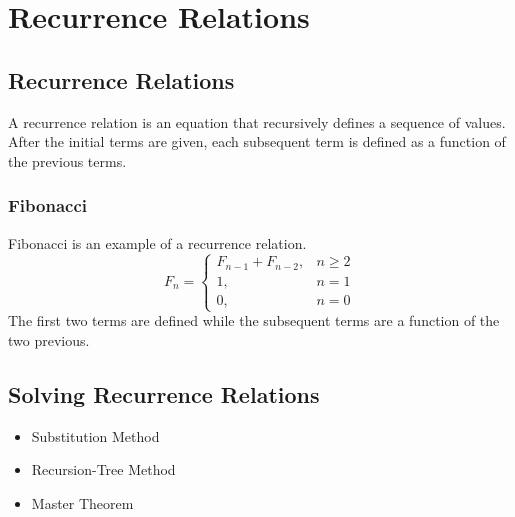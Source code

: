 \chapter{Recurrence Relations}

\newpage

\section{Recurrence Relations}
A recurrence relation is an equation that recursively defines a sequence of values. After the initial terms are given, each subsequent term is defined as a function of the previous terms.

\subsection*{Fibonacci}
Fibonacci is an example of a recurrence relation.
$$
F_n = \begin{cases}
	F_{n-1} + F_{n-2}, &  n \geq 2\\
	1, & n = 1\\
	0, & n = 0
\end{cases}
$$
The first two terms are defined while the subsequent terms are a function of the two previous.

\section{Solving Recurrence Relations}

\begin{itemize}
	\item Substitution Method
	\item Recursion-Tree Method
	\item Master Theorem
\end{itemize}
\newpage


\newpage

